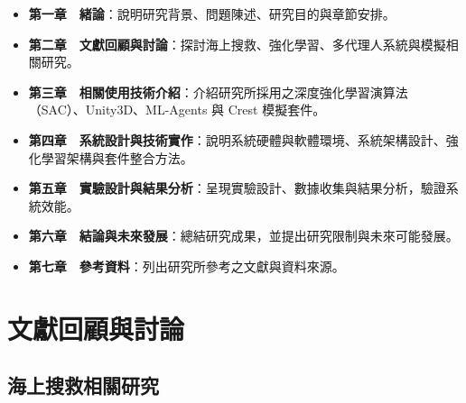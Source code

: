 \documentclass[12pt,a4paper]{article}
\begin{document}
\begin{itemize}
\item \textbf{第一章　緒論}：說明研究背景、問題陳述、研究目的與章節安排。
\item \textbf{第二章　文獻回顧與討論}：探討海上搜救、強化學習、多代理人系統與模擬相關研究。
\item \textbf{第三章　相關使用技術介紹}：介紹研究所採用之深度強化學習演算法（SAC）、Unity3D、ML-Agents 與 Crest 模擬套件。
\item \textbf{第四章　系統設計與技術實作}：說明系統硬體與軟體環境、系統架構設計、強化學習架構與套件整合方法。
\item \textbf{第五章　實驗設計與結果分析}：呈現實驗設計、數據收集與結果分析，驗證系統效能。
\item \textbf{第六章　結論與未來發展}：總結研究成果，並提出研究限制與未來可能發展。
\item \textbf{第七章　參考資料}：列出研究所參考之文獻與資料來源。
\end{itemize}

\newpage

\section{文獻回顧與討論}

\subsection{海上搜救相關研究}
\end{document}
